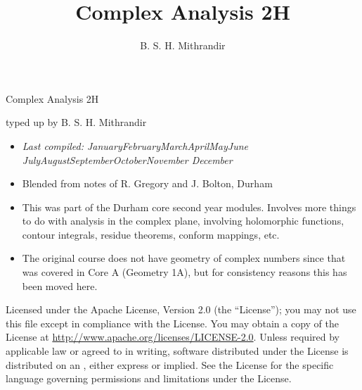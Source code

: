 \documentclass[letter-paper]{tufte-book}
\title{Complex Analysis 2H}
\author[]{B. S. H. Mithrandir}
\newcommand{\monthyear}{%
  \ifcase\month\or January\or February\or March\or April\or May\or June\or
  July\or August\or September\or October\or November\or
  December\fi\space\number\year
}
\begin{document}



\chapter*{}

\begin{fullwidth}

\par \begin{center}{\Huge Complex Analysis 2H}\end{center}

\vspace*{5mm}

\par \begin{center}{\Large typed up by B. S. H. Mithrandir}\end{center}

\vspace*{5mm}

\begin{itemize}
  \item \textit{Last compiled: \monthyear}
  \item Blended from notes of R. Gregory and J. Bolton, Durham
  \item This was part of the Durham core second year modules. Involves more
  things to do with analysis in the complex plane, involving holomorphic
  functions, contour integrals, residue theorems, conform mappings, etc.
  \item The original course does not have geometry of complex numbers since that
  was covered in Core A (Geometry 1A), but for consistency reasons this has been
  moved here.
\end{itemize}

\par

\par Licensed under the Apache License, Version 2.0 (the ``License''); you may not
use this file except in compliance with the License. You may obtain a copy
of the License at \url{http://www.apache.org/licenses/LICENSE-2.0}. Unless
required by applicable law or agreed to in writing, software distributed
under the License is distributed on an , either express or implied. See the
License for the specific language governing permissions and limitations
under the License.
\end{fullwidth}
\end{document}
